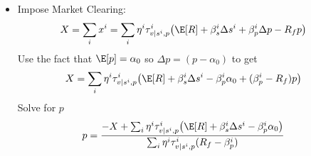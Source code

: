 \documentclass[12pt]{article}
\theoremstyle{plain}
\theoremstyle{definition}
\theoremstyle{remark}
\begin{document}
\begin{itemize}
  \item
    Impose Market Clearing:
    \begin{align*}
      X
      = \sum_i x^i
      &=
      \sum_i
      \eta^i \tau^i_{v|s^i,p}
      \big(
        \E[R]
        + \beta_s^i \Delta s^i
        + \beta_p^i \Delta p
        - R_fp
      \big)
    \end{align*}
    Use the fact that $\E[p]=\alpha_0$ so $\Delta p = (p-\alpha_0)$ to
    get
    \begin{align*}
      X
      &=
      \sum_i
      \eta^i \tau^i_{v|s^i,p}
      \big(
        \E[R]
        + \beta_s^i \Delta s^i
        - \beta_p^i \alpha_0
        + (\beta_p^i-R_f) p
      \big)
    \end{align*}
    Solve for $p$
    \begin{align*}
      p
      &=
      \frac{%
        -X
        +
        \sum_i
        \eta^i \tau^i_{v|s^i,p}
        \big(
          \E[R]
          + \beta_s^i \Delta s^i
          - \beta_p^i \alpha_0
        \big)
      }{%
        \sum_i
        \eta^i \tau^i_{v|s^i,p}
        (R_f-\beta_p^i)
      }
    \end{align*}


\end{itemize}
\end{document}
